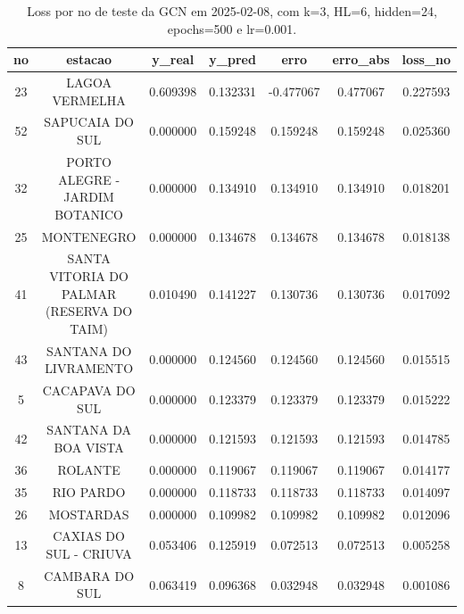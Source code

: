 \begin{table}[h]
\centering
\caption{Loss por no de teste da GCN em 2025-02-08, com k=3, HL=6, hidden=24, epochs=500 e lr=0.001.}
\label{tab:gcn_loss_k3_hl6_h24_e500_d20250208}
\begin{tabular}{ccccccc}
\toprule
no & estacao & y\_real & y\_pred & erro & erro\_abs & loss\_no \\
\midrule
23 & LAGOA VERMELHA & 0.609398 & 0.132331 & -0.477067 & 0.477067 & 0.227593 \\
52 & SAPUCAIA DO SUL & 0.000000 & 0.159248 & 0.159248 & 0.159248 & 0.025360 \\
32 & PORTO ALEGRE - JARDIM BOTANICO & 0.000000 & 0.134910 & 0.134910 & 0.134910 & 0.018201 \\
25 & MONTENEGRO & 0.000000 & 0.134678 & 0.134678 & 0.134678 & 0.018138 \\
41 & SANTA VITORIA DO PALMAR (RESERVA DO TAIM) & 0.010490 & 0.141227 & 0.130736 & 0.130736 & 0.017092 \\
43 & SANTANA DO LIVRAMENTO & 0.000000 & 0.124560 & 0.124560 & 0.124560 & 0.015515 \\
5 & CACAPAVA DO SUL & 0.000000 & 0.123379 & 0.123379 & 0.123379 & 0.015222 \\
42 & SANTANA DA BOA VISTA & 0.000000 & 0.121593 & 0.121593 & 0.121593 & 0.014785 \\
36 & ROLANTE & 0.000000 & 0.119067 & 0.119067 & 0.119067 & 0.014177 \\
35 & RIO PARDO & 0.000000 & 0.118733 & 0.118733 & 0.118733 & 0.014097 \\
26 & MOSTARDAS & 0.000000 & 0.109982 & 0.109982 & 0.109982 & 0.012096 \\
13 & CAXIAS DO SUL - CRIUVA & 0.053406 & 0.125919 & 0.072513 & 0.072513 & 0.005258 \\
8 & CAMBARA DO SUL & 0.063419 & 0.096368 & 0.032948 & 0.032948 & 0.001086 \\
\bottomrule
\end{tabular}
\end{table}
